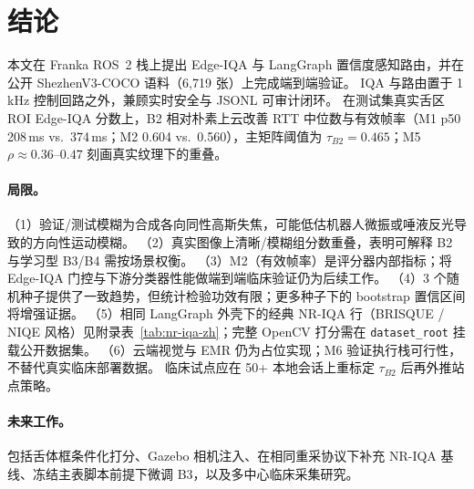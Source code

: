 \section{结论}
\label{sec:conclusion-zh}

本文在 Franka ROS~2 栈上提出 Edge-IQA 与 LangGraph 置信度感知路由，并在公开 ShezhenV3-COCO 语料（6{,}719 张）上完成端到端验证。
IQA 与路由置于 1\,kHz 控制回路之外，兼顾实时安全与 JSONL 可审计闭环。
在测试集真实舌区 ROI Edge-IQA 分数上，B2 相对朴素上云改善 RTT 中位数与有效帧率（M1 p50 208\,ms vs.\ 374\,ms；M2 0.604 vs.\ 0.560），主矩阵阈值为 $\tau_{B2}{=}0.465$；M5 $\rho{\approx}0.36$--$0.47$ 刻画真实纹理下的重叠。

\paragraph{局限。}
（1）验证/测试模糊为合成各向同性高斯失焦，可能低估机器人微振或唾液反光导致的方向性运动模糊。
（2）真实图像上清晰/模糊组分数重叠，表明可解释 B2 与学习型 B3/B4 需按场景权衡。
（3）M2（有效帧率）是评分器内部指标；将 Edge-IQA 门控与下游分类器性能做端到端临床验证仍为后续工作。
（4）3 个随机种子提供了一致趋势，但统计检验功效有限；更多种子下的 bootstrap 置信区间将增强证据。
（5）相同 LangGraph 外壳下的经典 NR-IQA 行（BRISQUE / NIQE 风格）见附录表~\ref{tab:nr-iqa-zh}；完整 OpenCV 打分需在 \texttt{dataset\_root} 挂载公开数据集。
（6）云端视觉与 EMR 仍为占位实现；M6 验证执行栈可行性，不替代真实临床部署数据。
临床试点应在 50+ 本地会话上重标定 $\tau_{B2}$ 后再外推站点策略。

\paragraph{未来工作。}
包括舌体框条件化打分、Gazebo 相机注入、在相同重采协议下补充 NR-IQA 基线、冻结主表脚本前提下微调 B3，以及多中心临床采集研究。
